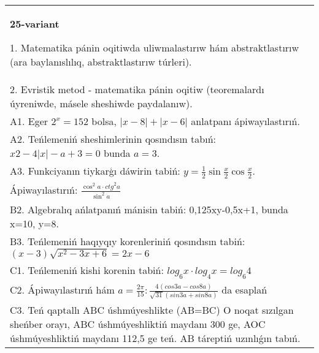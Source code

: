 \documentclass{article}
\begin{document}
\begin{tabular}{m{17cm}}
\textbf{25-variant}

1. Matematika pánin oqitiwda uliwmalastırıw hám abstraktlastırıw (ara baylanıslılıq, abstraktlastırıw túrleri). \\
2. Evristik metod - matematika pánin oqitiw (teoremalardı úyreniwde, másele sheshiwde paydalanıw). \\
A1. Eger \(2^{x} = 152\) bolsa, \(|x - 8| + |x - 6|\) anlatpanı ápiwayılastırıń. \\
A2. Teńlemeniń sheshimlerinin qosındısın tabıń: \(x2 - 4|x| - a + 3 = 0\) bunda \(a = 3\). \\
A3. Funkciyanın tiykarģı dáwirin tabiń: \(y = \frac{1}{2}\sin{\frac{x}{2}\cos\frac{x}{2}}\). \\
Ápiwayılastırıń: \(\frac{\cos^{2}a \cdot {ctg}^{2}a}{\sin^{2}a}\) \\
B2. Algebralıq ańlatpanıń mánisin tabiń: 0,125xy-0,5x+1, bunda x=10, y=8. \\
B3. Teńlemeniń haqıyqıy korenleriniń qosındısın tabiń: \((x-3) \sqrt{x^{2} - 3x + 6} = 2x - 6\) \\
C1. Teńlemeniń kishi korenin tabiń: \(log_{6}x \cdot log_{4}x = log_{6}4\) \\
C2. Ápiwayılastırıń hám \(a = \frac{2\pi}{15}:\frac{4 (cos3a - cos8a) }{\sqrt{31} (sin3a + sin8a) }\) da esaplań \\
C3. Teń qaptallı ABC úshmúyeshlikte (AB=BC) O noqat sızılgan sheńber orayı, ABC úshmúyeshliktiń maydanı 300 ge, AOC úshmúyeshliktiń maydanı 112,5 ge teń. AB táreptiń uzınlıǵın tabıń. \\

\end{tabular}
\vspace{1cm}
\end{document}
